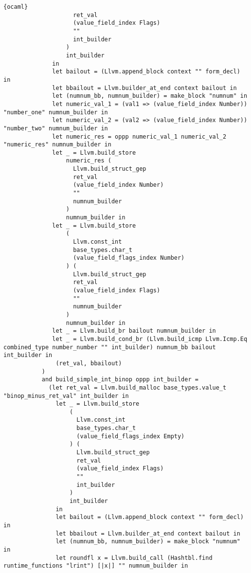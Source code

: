 \begin{lstlisting}{ocaml}
                    ret_val
                    (value_field_index Flags)
                    ""
                    int_builder
                  )
                  int_builder
              in
              let bailout = (Llvm.append_block context "" form_decl) in
              let bbailout = Llvm.builder_at_end context bailout in
              let (numnum_bb, numnum_builder) = make_block "numnum" in
              let numeric_val_1 = (val1 => (value_field_index Number)) "number_one" numnum_builder in
              let numeric_val_2 = (val2 => (value_field_index Number)) "number_two" numnum_builder in
              let numeric_res = oppp numeric_val_1 numeric_val_2 "numeric_res" numnum_builder in
              let _ = Llvm.build_store
                  numeric_res (
                    Llvm.build_struct_gep
                    ret_val
                    (value_field_index Number)
                    ""
                    numnum_builder
                  )
                  numnum_builder in
              let _ = Llvm.build_store
                  (
                    Llvm.const_int
                    base_types.char_t
                    (value_field_flags_index Number)
                  ) (
                    Llvm.build_struct_gep
                    ret_val
                    (value_field_index Flags)
                    ""
                    numnum_builder
                  )
                  numnum_builder in
              let _ = Llvm.build_br bailout numnum_builder in
              let _ = Llvm.build_cond_br (Llvm.build_icmp Llvm.Icmp.Eq combined_type number_number "" int_builder) numnum_bb bailout int_builder in
               (ret_val, bbailout)
           )
           and build_simple_int_binop oppp int_builder =
             (let ret_val = Llvm.build_malloc base_types.value_t "binop_minus_ret_val" int_builder in
               let _ = Llvm.build_store
                   (
                     Llvm.const_int
                     base_types.char_t
                     (value_field_flags_index Empty)
                   ) (
                     Llvm.build_struct_gep
                     ret_val
                     (value_field_index Flags)
                     ""
                     int_builder
                   )
                   int_builder
               in
               let bailout = (Llvm.append_block context "" form_decl) in
               let bbailout = Llvm.builder_at_end context bailout in
               let (numnum_bb, numnum_builder) = make_block "numnum" in
               let roundfl x = Llvm.build_call (Hashtbl.find runtime_functions "lrint") [|x|] "" numnum_builder in

\end{lstlisting}

